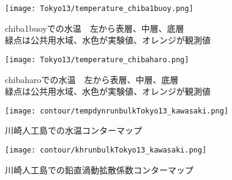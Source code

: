 \documentclass[fontsize=12pt,paper=a4]{jlreq}
\begin{document}
\begin{figure}[hbtp]
  \centering
  \texttt{[image: Tokyo13/temperature\_chiba1buoy.png]}
  \caption{chiba1buoyでの水温　左から表層、中層、底層\\緑点は公共用水域、水色が実験値、オレンジが観測値}
\end{figure}

\begin{figure}[hbtp]
  \centering
  \texttt{[image: Tokyo13/temperature\_chibaharo.png]}
  \caption{chibaharoでの水温　左から表層、中層、底層\\緑点は公共用水域、水色が実験値、オレンジが観測値}
\end{figure}


\begin{figure}[hbtp]
    \centering
    \texttt{[image: contour/tempdynrunbulkTokyo13\_kawasaki.png]}
    \caption{川崎人工島での水温コンターマップ}
\end{figure}


\begin{figure}[hbtp]
  \centering
  \texttt{[image: contour/khrunbulkTokyo13\_kawasaki.png]}
  \caption{川崎人工島での鉛直渦動拡散係数コンターマップ}
\end{figure}
\end{document}
